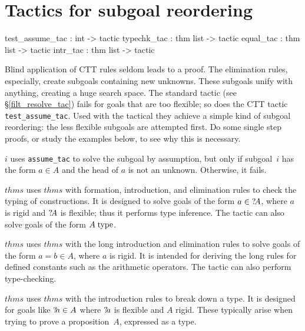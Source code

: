 \section{Tactics for subgoal reordering}
\begin{ttbox}
test_assume_tac : int -> tactic
typechk_tac     : thm list -> tactic
equal_tac       : thm list -> tactic
intr_tac        : thm list -> tactic
\end{ttbox}
Blind application of CTT rules seldom leads to a proof.  The elimination
rules, especially, create subgoals containing new unknowns.  These subgoals
unify with anything, creating a huge search space.  The standard tactic
(see %
        {\S\ref{filt_resolve_tac}})
%
fails for goals that are too flexible; so does the CTT tactic {\tt
  test_assume_tac}.  Used with the tactical  they
achieve a simple kind of subgoal reordering: the less flexible subgoals are
attempted first.  Do some single step proofs, or study the examples below,
to see why this is necessary.
\begin{ttdescription}
\item[\ttindexbold{test_assume_tac} $i$] 
uses {\tt assume_tac} to solve the subgoal by assumption, but only if
subgoal~$i$ has the form $a\in A$ and the head of $a$ is not an unknown.
Otherwise, it fails.

\item[\ttindexbold{typechk_tac} $thms$] 
uses $thms$ with formation, introduction, and elimination rules to check
the typing of constructions.  It is designed to solve goals of the form
$a\in {?\!A}$, where $a$ is rigid and ${?\!A}$ is flexible; thus it
performs type inference.  The tactic can also solve goals of
the form $A\;\rm type$.

\item[\ttindexbold{equal_tac} $thms$]
uses $thms$ with the long introduction and elimination rules to solve goals
of the form $a=b\in A$, where $a$ is rigid.  It is intended for deriving
the long rules for defined constants such as the arithmetic operators.  The
tactic can also perform type-checking.

\item[\ttindexbold{intr_tac} $thms$]
uses $thms$ with the introduction rules to break down a type.  It is
designed for goals like ${?\!a}\in A$ where ${?\!a}$ is flexible and $A$
rigid.  These typically arise when trying to prove a proposition~$A$,
expressed as a type.
\end{ttdescription}



